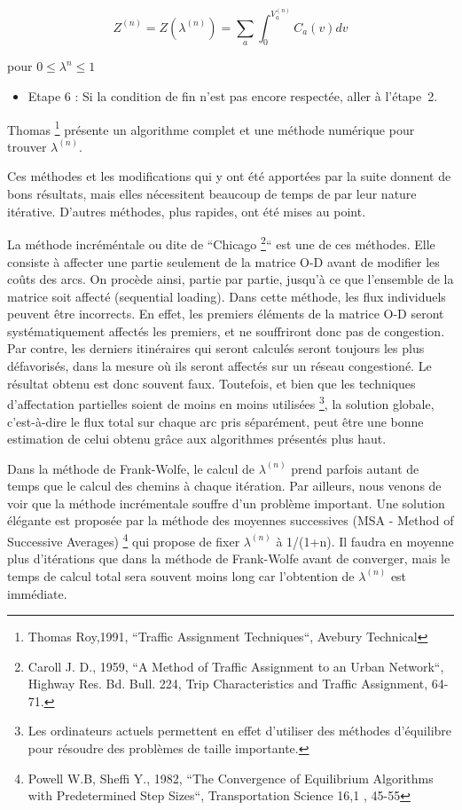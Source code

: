 $$Z^{(n)}=Z(\lambda^{(n)})=\sum_a\int_0^{V_a^{(n)}}C_a(v)dv$$
\begin{center}
pour $0\leq \lambda^n \leq 1$
\end{center}


\begin{itemize}
\item Etape 6 : Si la condition de fin n'est pas encore respectée, aller à
l'étape~2.
\end{itemize}

Thomas \footnote{Thomas Roy,1991, ``Traffic Assignment
Techniques``, Avebury Technical} présente un algorithme complet et
une méthode numérique pour trouver $\lambda^{(n)}$.

Ces méthodes et les modifications qui y ont été apportées par la
suite donnent de bons résultats, mais elles nécessitent beaucoup de
temps de par leur nature itérative. D'autres méthodes, plus
rapides, ont été mises au point.

La méthode incréméntale ou dite de ``Chicago \footnote{ Caroll J. D., 1959, ``A Method of
Traffic Assignment to an Urban Network``, Highway Res. Bd. Bull. 224, Trip
Characteristics and Traffic Assignment, 64-71.}`` est une de ces méthodes. Elle
consiste à affecter une partie seulement de la matrice O-D avant de modifier les
coûts des arcs. On procède ainsi, partie par partie, jusqu'à ce que l'ensemble
de la matrice soit affecté (sequential loading). Dans cette méthode, les flux
individuels peuvent être incorrects. En effet, les premiers éléments de la
matrice O-D seront systéma\-ti\-que\-ment affectés les premiers, et ne
souffriront donc pas de congestion. Par contre, les derniers itinéraires qui
seront calculés seront toujours les plus défavorisés, dans la mesure où ils
seront affectés sur un réseau congestioné. Le résultat obtenu est donc souvent
faux. Toutefois, et bien que les techniques d'affectation partielles soient de
moins en moins utilisées
\footnote{Les ordinateurs actuels permettent en effet d'utiliser
des méthodes d'équilibre pour résoudre des problèmes de taille
importante.}, la solution globale, c'est-à-dire le flux total sur
chaque arc pris séparément, peut être une bonne estimation de celui
obtenu grâce aux algorithmes présentés plus haut.

Dans la méthode de Frank-Wolfe, le calcul de $\lambda^{(n)}$ prend
parfois autant de temps que le calcul des chemins à chaque itération. Par 
ailleurs, nous venons de voir que la méthode incrémentale souffre d'un problème
important. Une solution élégante est proposée par la méthode des
moyennes successives (MSA - Method of Successive Averages)
\footnote{Powell W.B, Sheffi Y., 1982, ``The Convergence of Equilibrium 
Algorithms with Predetermined Step Sizes``, Transportation Science 16,1 , 45-55 }
 qui propose de fixer $\lambda^{(n)}$ à 1/(1+n). Il faudra en moyenne plus d'itérations
que dans la méthode de Frank-Wolfe avant de converger, mais le temps
de calcul total sera souvent moins long car l'obtention de $\lambda^{(n)}$
est immédiate.

